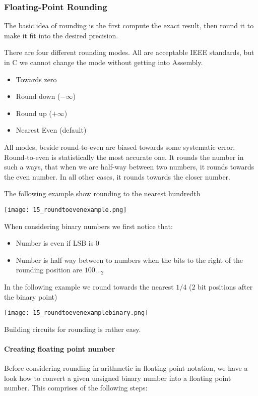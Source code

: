 

\subsubsection{Floating-Point Rounding}
The basic idea of rounding is the first compute the exact result, then round it to make it fit into the desired precision.

There are four different rounding modes. All are acceptable IEEE standards, but in C we cannot change the mode without getting into Assembly.
\begin{itemize}
    \item Towards zero
    \item Round down ($-\infty$)
    \item Round up ($+\infty$)
    \item Nearest Even (default)
\end{itemize}

All modes, beside round-to-even are biased towards some systematic error. Round-to-even is statistically the most accurate one. It rounds the number in such a ways, that when we are half-way between two numbers, it rounds towards the even number. In all other cases, it rounds towards the closer number.

The following example show rounding to the nearest hundredth

\texttt{[image: 15\_roundtoevenexample.png]}

When considering binary numbers we first notice that:
\begin{itemize}
    \item Number is even if LSB is $0$
    \item Number is half way between to numbers when the bits to the right of the rounding position are $100\dots _2$
\end{itemize}

In the following example we round towards the nearest $1/4$ ($2$ bit positions after the binary point)

\texttt{[image: 15\_roundtoevenexamplebinary.png]}

Building circuits for rounding is rather easy.

\paragraph{Creating floating point number}
Before considering rounding in arithmetic in floating point notation, we have a look how to convert a given unsigned binary number into a floating point number. This comprises of the following steps:

